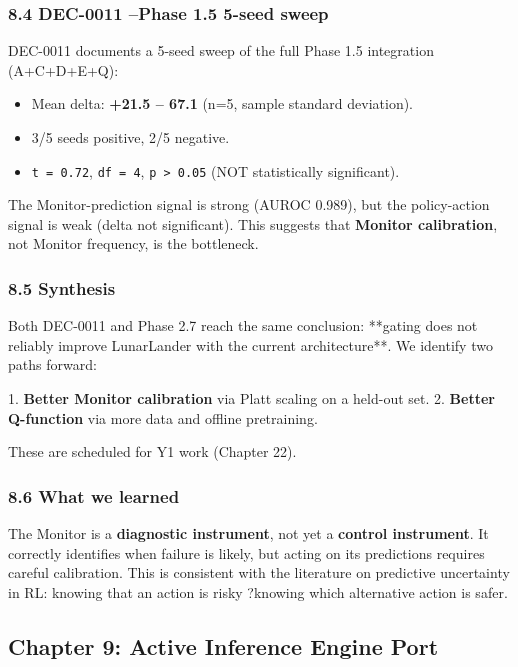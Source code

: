 \documentclass[11pt]{article}
\begin{document}
\subsubsection{8.4 DEC-0011 --Phase 1.5 5-seed sweep}

DEC-0011 documents a 5-seed sweep of the full Phase 1.5 integration (A+C+D+E+Q):

\begin{itemize}
  \item Mean delta: \textbf{+21.5 -- 67.1} (n=5, sample standard deviation).
  \item 3/5 seeds positive, 2/5 negative.
  \item \texttt{t = 0.72}, \texttt{df = 4}, \texttt{p > 0.05} (NOT statistically significant).
\end{itemize}


The Monitor-prediction signal is strong (AUROC 0.989), but the
policy-action signal is weak (delta not significant). This suggests that
\textbf{Monitor calibration}, not Monitor frequency, is the bottleneck.

\subsubsection{8.5 Synthesis}

Both DEC-0011 and Phase 2.7 reach the same conclusion: **gating does not reliably
improve LunarLander with the current architecture**. We identify two paths
forward:

1. \textbf{Better Monitor calibration} via Platt scaling on a held-out set.
2. \textbf{Better Q-function} via more data and offline pretraining.

These are scheduled for Y1 work (Chapter 22).

\subsubsection{8.6 What we learned}

The Monitor is a \textbf{diagnostic instrument}, not yet a \textbf{control instrument}. It
correctly identifies when failure is likely, but acting on its predictions
requires careful calibration. This is consistent with the literature on
predictive uncertainty in RL: knowing that an action is risky ?knowing which
alternative action is safer.

\hrulefill

\subsection{Chapter 9: Active Inference Engine Port}
\end{document}
